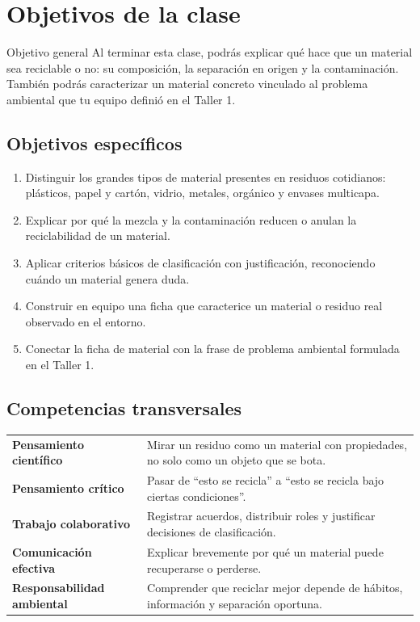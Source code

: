 \documentclass[10pt,a4paper]{article}
\begin{document}
\newpage
\section{Objetivos de la clase}

\begin{keybox}{Objetivo general}
Al terminar esta clase, podrás explicar qué hace que un material sea reciclable o no: su composición, la separación en origen y la contaminación. También podrás caracterizar un material concreto vinculado al problema ambiental que tu equipo definió en el Taller 1.
\end{keybox}

\subsection{Objetivos específicos}
\begin{enumerate}
  \item Distinguir los grandes tipos de material presentes en residuos cotidianos: plásticos, papel y cartón, vidrio, metales, orgánico y envases multicapa.
  \item Explicar por qué la mezcla y la contaminación reducen o anulan la reciclabilidad de un material.
  \item Aplicar criterios básicos de clasificación con justificación, reconociendo cuándo un material genera duda.
  \item Construir en equipo una ficha que caracterice un material o residuo real observado en el entorno.
  \item Conectar la ficha de material con la frase de problema ambiental formulada en el Taller 1.
\end{enumerate}

\subsection{Competencias transversales}
\begin{tabularx}{\textwidth}{@{}p{37mm}Y@{}}
\textbf{\color{AIEPNavy}Pensamiento científico} & Mirar un residuo como un material con propiedades, no solo como un objeto que se bota. \\
\textbf{\color{AIEPNavy}Pensamiento crítico} & Pasar de ``esto se recicla'' a ``esto se recicla bajo ciertas condiciones''. \\
\textbf{\color{AIEPNavy}Trabajo colaborativo} & Registrar acuerdos, distribuir roles y justificar decisiones de clasificación. \\
\textbf{\color{AIEPNavy}Comunicación efectiva} & Explicar brevemente por qué un material puede recuperarse o perderse. \\
\textbf{\color{AIEPNavy}Responsabilidad ambiental} & Comprender que reciclar mejor depende de hábitos, información y separación oportuna. \\
\end{tabularx}
\end{document}

